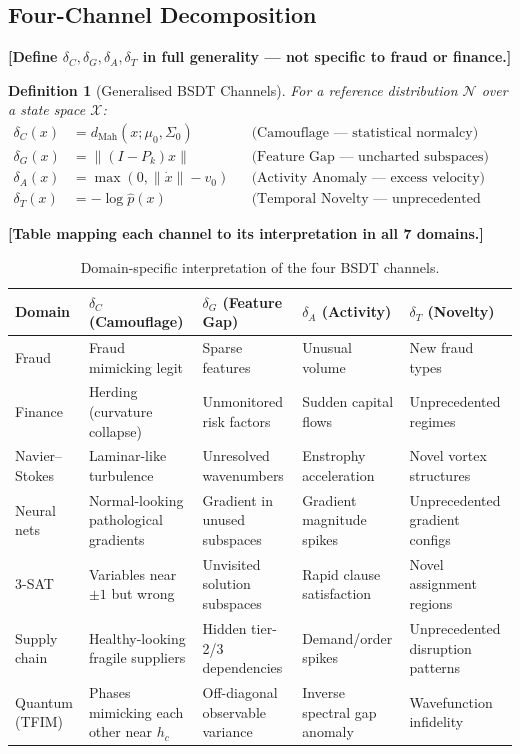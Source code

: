 \documentclass[11pt,a4paper]{article}
\newtheorem{definition}[theorem]{Definition}
\begin{document}
\subsection{Four-Channel Decomposition}

\textbf{[Define $\delta_C, \delta_G, \delta_A, \delta_T$ in full
generality — not specific to fraud or finance.]}

\begin{definition}[Generalised BSDT Channels]
For a reference distribution $\mathcal{N}$ over a state space $\mathcal{X}$:
\begin{align}
  \delta_C(x) &= d_{\mathrm{Mah}}(x; \mu_0, \Sigma_0)
    && \text{(Camouflage — statistical normalcy)} \\
  \delta_G(x) &= \|(I - P_k)x\|
    && \text{(Feature Gap — uncharted subspaces)} \\
  \delta_A(x) &= \max(0, \|\dot{x}\| - v_0)
    && \text{(Activity Anomaly — excess velocity)} \\
  \delta_T(x) &= -\log \hat{p}(x)
    && \text{(Temporal Novelty — unprecedented states)}
\end{align}
\end{definition}

\textbf{[Table mapping each channel to its interpretation in all 7 domains.]}

\begin{table}[H]
\centering
\caption{Domain-specific interpretation of the four BSDT channels.}
\label{tab:channels}
\small
\begin{tabular}{@{}p{1.5cm}p{2cm}p{2cm}p{2cm}p{2cm}@{}}
\toprule
\textbf{Domain} & $\delta_C$ (Camouflage) & $\delta_G$ (Feature Gap) &
$\delta_A$ (Activity) & $\delta_T$ (Novelty) \\
\midrule
Fraud &
  Fraud mimicking legit &
  Sparse features &
  Unusual volume &
  New fraud types \\
Finance &
  Herding (curvature collapse) &
  Unmonitored risk factors &
  Sudden capital flows &
  Unprecedented regimes \\
Navier--Stokes &
  Laminar-like turbulence &
  Unresolved wavenumbers &
  Enstrophy acceleration &
  Novel vortex structures \\
Neural nets &
  Normal-looking pathological gradients &
  Gradient in unused subspaces &
  Gradient magnitude spikes &
  Unprecedented gradient configs \\
3-SAT &
  Variables near $\pm 1$ but wrong &
  Unvisited solution subspaces &
  Rapid clause satisfaction &
  Novel assignment regions \\
Supply chain &
  Healthy-looking fragile suppliers &
  Hidden tier-2/3 dependencies &
  Demand/order spikes &
  Unprecedented disruption patterns \\
Quantum (TFIM) &
  Phases mimicking each other near $h_c$ &
  Off-diagonal observable variance &
  Inverse spectral gap anomaly &
  Wavefunction infidelity \\
\bottomrule
\end{tabular}
\end{table}
\end{document}
